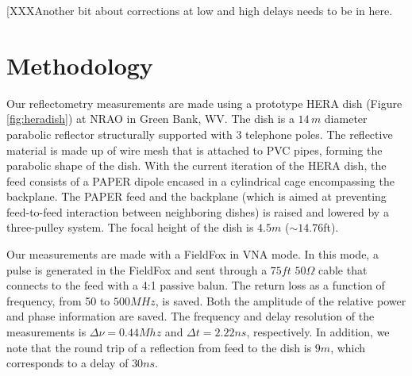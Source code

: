 \documentclass[12pt,preprint]{aastex}
\begin{document}
[XXXAnother bit about corrections at low and high delays needs to be in here. 


\section{Methodology}{\label{sec:methods}}

Our reflectometry measurements are made using a prototype HERA dish (Figure
\ref{fig:heradish}) at NRAO in Green Bank, WV. The dish is a $14\,m$ diameter
parabolic reflector structurally supported with 3 telephone poles. The
reflective material is made up of wire mesh that is attached to PVC
pipes, forming the parabolic shape of the dish. With the current iteration of
the HERA dish, the feed consists of a PAPER dipole encased in a cylindrical cage
encompassing the backplane. The PAPER feed and the backplane (which is aimed at
preventing feed-to-feed interaction between neighboring dishes) is raised and
lowered by a three-pulley system. The focal height of the dish is $4.5m$
($\sim{14.76}$ft).  


Our measurements are made with a FieldFox in VNA mode. In this mode, a pulse
is generated in the FieldFox and sent through a $75ft$ $50\Omega$ cable that
connects to the feed with a 4:1 passive balun. The return loss as a function of
frequency, from 50 to $500MHz$, is saved.  Both the amplitude of the relative
power and phase information are saved.  The frequency and delay resolution of
the measurements is $\Delta\nu = 0.44 Mhz$ and $\Delta{t}=2.22ns$, respectively.
In addition, we note that the round trip of a reflection from feed to the dish
is $9m$, which corresponds to a delay of $30ns$.



\end{document}
